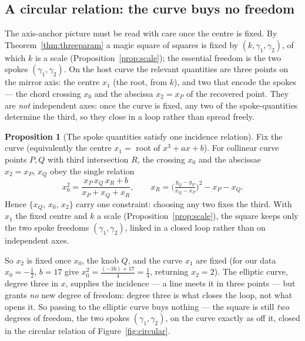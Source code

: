 \documentclass[11pt]{article}
\theoremstyle{definition}
\newtheorem{proposition}{Proposition}
\begin{document}
\subsection{A circular relation: the curve buys no freedom}\label{sec:circular}

The axis-anchor picture must be read with care once the centre is fixed. By
Theorem~\ref{thm:threeparam} a magic square of squares is fixed by $(k,\gamma_1,\gamma_2)$,
of which $k$ is a scale (Proposition~\ref{prop:scale}); the essential freedom is the two
spokes $(\gamma_1,\gamma_2)$. On the host curve the relevant quantities are three points
on the mirror axis: the centre $x_1$ (the root, from $k$), and two that encode the spokes
--- the chord crossing $x_0$ and the abscissa $x_2=x_P$ of the recovered point. They are
\emph{not} independent axes: once the curve is fixed, any two of the spoke-quantities
determine the third, so they close in a loop rather than spread freely.

\begin{proposition}[The spoke quantities satisfy one incidence relation]\label{prop:circular}
Fix the curve (equivalently the centre $x_1=$ root of $x^3+ax+b$). For collinear curve
points $P,Q$ with third intersection $R$, the crossing $x_0$ and the abscissae
$x_2=x_P,\,x_Q$ obey the single relation
\[
  x_0^{2}=\frac{x_P\,x_Q\,x_R+b}{x_P+x_Q+x_R},
  \qquad
  x_R=\Big(\tfrac{y_Q-y_P}{x_Q-x_P}\Big)^{2}-x_P-x_Q .
\]
Hence $\{x_Q,\,x_0,\,x_2\}$ carry one constraint: choosing any two fixes the third. With
$x_1$ the fixed centre and $k$ a scale (Proposition~\ref{prop:scale}), the square keeps
only the two spoke freedoms $(\gamma_1,\gamma_2)$, linked in a closed loop rather than on
independent axes.
\end{proposition}

\noindent So $x_2$ is fixed once $x_0$, the knob $Q$, and the curve $x_1$ are fixed
(for our data $x_0=-\tfrac12,\,b=17$ give $x_0^{2}=\tfrac{(-16)+17}{4}=\tfrac14$,
returning $x_2=2$). The elliptic curve, degree three in $x$, supplies the incidence --- a
line meets it in three points --- but grants \emph{no} new degree of freedom: degree
three is what closes the loop, not what opens it. So passing to the elliptic curve buys
nothing --- the square is still \emph{two} degrees of freedom, the two spokes
$(\gamma_1,\gamma_2)$, on the curve exactly as off it, closed in the circular relation of
Figure~\ref{fig:circular}.
\end{document}
